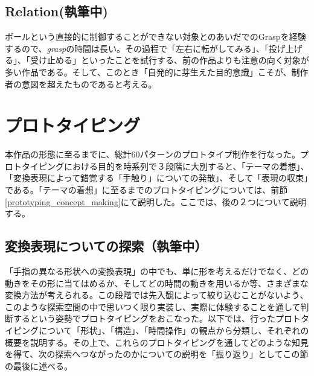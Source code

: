 \subsection*{Relation(執筆中)}
ボールという直接的に制御することができない対象とのあいだでのGraspを経験するので、\textit{grasp}の時間は長い。その過程で「左右に転がしてみる」、「投げ上げる」、「受け止める」といったことを試行する、前の作品よりも注意の向く対象が多い作品である。そして、このとき「自発的に芽生えた目的意識」こそが、制作者の意図を超えたものであると考える。




\section{プロトタイピング}
本作品の形態に至るまでに、総計60パターンのプロトタイプ制作を行なった。プロトタイピングにおける目的を時系列で３段階に大別すると、「テーマの着想」、「変換表現によって錯覚する「手触り」についての発散」、そして「表現の収束」である。「テーマの着想」に至るまでのプロトタイピングについては、前節\ref{prototyping_concept_making}にて説明した。ここでは、後の２つについて説明する。

\subsection{変換表現についての探索（執筆中）}
「手指の異なる形状への変換表現」の中でも、単に形を考えるだけでなく、どの動きをその形に当てはめるか、そしてどの時間の動きを用いるか等、さまざまな変換方法が考えられる。この段階では先入観によって絞り込むことがないよう、このような探索空間の中で思いつく限り実装し、実際に体験することを通して判断するという姿勢でプロトタイピングをおこなった。以下では、行ったプロトタイピングについて「形状」、「構造」、「時間操作」の観点から分類し、それぞれの概要を説明する。その上で、これらのプロトタイピングを通してどのような知見を得て、次の探索へつながったのかについての説明を「振り返り」としてこの節の最後に述べる。

